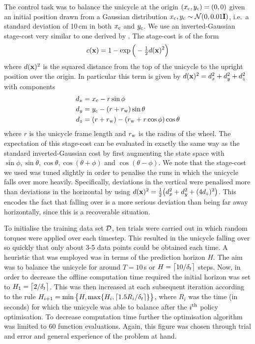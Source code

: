 The control task was to balance the unicycle at the origin $(x_{\text{c}},y_{\text{c}}) = (0,0)$ given an initial position drawn from a Gaussian distribution $x_{\text{c}},y_{\text{c}} \sim \mathcal{N}(0,0.01\mathbf{I})$, i.e.\ a standard deviation of 10$\,$cm in both $x_{\text{c}}$ and $y_{\text{c}}$. We use an inverted-Gaussian stage-cost very similar to one derived by \cite{DHR11}. The stage-cost is of the form
\begin{equation}
c(\mathbf{x}) = 1 - \exp\Big(-\tfrac{1}{2}d(\mathbf{x})^2\Big)
\label{eqn:unicost}
\end{equation}
where $d(\mathbf{x})^2$ is the squared distance from the top of the unicycle to the upright position over the origin. In particular this term is given by $d(\mathbf{x})^2 = d_x^2 + d_y^2 + d_z^2$ with components
\begin{align*}
d_x &= x_{\text{c}} - r\sin\phi \\
d_y &= y_{\text{c}} - (r+r_{\text{w}})\sin\theta \\
d_z &= (r+r_{\text{w}}) - (r_{\text{w}} + r\cos\phi)\cos\theta
\end{align*}
where $r$ is the unicycle frame length and $r_{\text{w}}$ is the radius of the wheel. The expectation of this stage-cost can be evaluated in exactly the same way as the standard inverted-Gaussian cost by first augmenting the state space with $\sin\phi, \sin\theta, \cos\theta, \cos(\theta+\phi)$ and $\cos(\theta-\phi)$. 
%
We note that the stage-cost we used was tuned slightly in order to penalise the runs in which the unicycle falls over more heavily. Specifically, deviations in the vertical were penalised more than deviations in the horizontal by using $d(\mathbf{x})^2 = \tfrac{1}{2}\big(d_x^2 + d_y^2 + (4d_z)^2\big)$. This encodes the fact that falling over is a more serious deviation than being far away horizontally, since this is a recoverable situation.


To initialise the training data set $\mathcal{D}$, ten trials were carried out in which random torques were applied over each timestep. This resulted in the unicycle falling over so quickly that only about 3-5 data points could be obtained each time.
%
A heuristic that was employed was in terms of the prediction horizon $H$. The aim was to balance the unicycle for around $T = 10\,$s or $H = \big\lceil 10/\delta_t \big\rceil$ steps. Now, in order to decrease the offline computation time required the initial horizon was set to $H_1 = \big\lceil 2/\delta_t \big\rceil$. This was then increased at each subsequent iteration according to the rule $H_{i+1} = \min\big\{H, \max\{H_i,\lceil 1.5R_i/\delta_t \rceil\} \big\}$, where $R_i$ was the time (in seconds) for which the unicycle was able to balance after the $i^{\text{th}}$ policy optimisation. To decrease computation time further the optimisation algorithm was limited to 60 function evaluations. Again, this figure was chosen through trial and error and general experience of the problem at hand.

